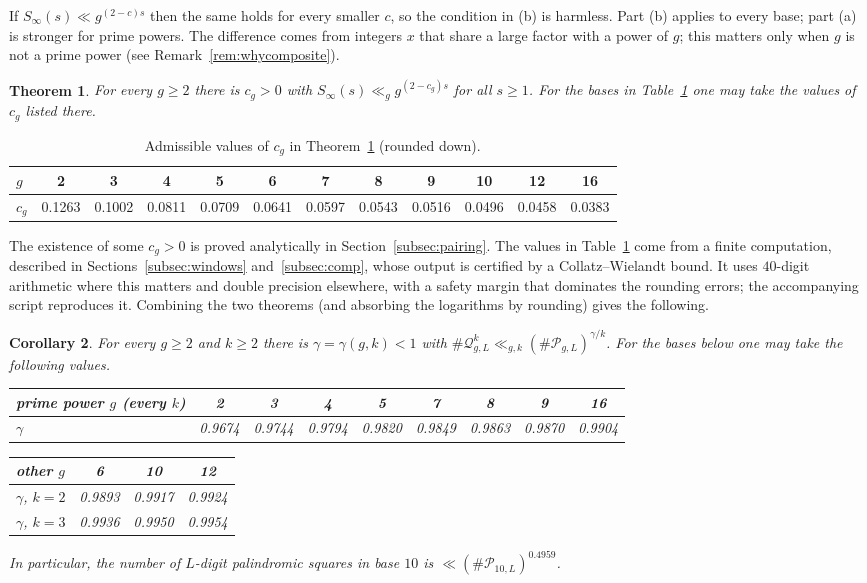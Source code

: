 \documentclass[11pt]{amsart}
\newtheorem{theorem}{Theorem}[section]
\newtheorem{corollary}[theorem]{Corollary}
\theoremstyle{definition}
\numberwithin{equation}{section}
\newcommand{\cP}{\mathcal{P}}
\newcommand{\cQ}{\mathcal{Q}}
\newcommand{\Sinf}{S_\infty}
\begin{document}
If $\Sinf(s)\ll g^{(2-c)s}$ then the same holds for every smaller $c$, so
the condition in (b) is harmless. Part (b) applies to every base; part (a)
is stronger for prime powers. The difference comes from integers $x$ that
share a large factor with a power of $g$; this matters only when $g$ is
not a prime power (see Remark~\ref{rem:whycomposite}).

\begin{theorem}\label{thm:sup}
For every $g\ge2$ there is $c_g>0$ with $\Sinf(s)\ll_gg^{(2-c_g)s}$ for all
$s\ge1$. For the bases in Table~\ref{tab:c} one may take the values of $c_g$
listed there.
\end{theorem}

\begin{table}[ht]
\caption{Admissible values of $c_g$ in Theorem~\ref{thm:sup} (rounded down).}\label{tab:c}
\small
\begin{tabular}{@{}lccccccccccc@{}}
\toprule
$g$ & 2 & 3 & 4 & 5 & 6 & 7 & 8 & 9 & 10 & 12 & 16\\
\midrule
$c_g$ & 0.1263 & 0.1002 & 0.0811 & 0.0709 & 0.0641 & 0.0597 & 0.0543 & 0.0516 & 0.0496 & 0.0458 & 0.0383\\
\bottomrule
\end{tabular}
\end{table}

The existence of some $c_g>0$ is proved analytically in
Section~\ref{subsec:pairing}. The values in Table~\ref{tab:c} come from a
finite computation, described in Sections~\ref{subsec:windows}
and~\ref{subsec:comp}, whose output is certified by a Collatz--Wielandt
bound. It uses $40$-digit arithmetic where this matters and double
precision elsewhere, with a safety margin that dominates the rounding
errors; the accompanying script reproduces it.
Combining the two theorems (and absorbing the logarithms by rounding) gives
the following.

\begin{corollary}\label{cor:main}
For every $g\ge2$ and $k\ge2$ there is $\gamma=\gamma(g,k)<1$ with
$\#\cQ^k_{g,L}\ll_{g,k}(\#\cP_{g,L})^{\gamma/k}$. For the bases below one
may take the following values.
\begin{center}\small\upshape
\begin{tabular}{@{}lcccccccc@{}}
\toprule
prime power $g$ (every $k$) & 2 & 3 & 4 & 5 & 7 & 8 & 9 & 16\\
\midrule
$\gamma$ & 0.9674 & 0.9744 & 0.9794 & 0.9820 & 0.9849 & 0.9863 & 0.9870 & 0.9904\\
\bottomrule
\end{tabular}

\medskip
\begin{tabular}{@{}lccc@{}}
\toprule
other $g$ & 6 & 10 & 12\\
\midrule
$\gamma$, $k=2$ & 0.9893 & 0.9917 & 0.9924\\
$\gamma$, $k=3$ & 0.9936 & 0.9950 & 0.9954\\
\bottomrule
\end{tabular}
\end{center}
In particular, the number of $L$-digit palindromic squares in base $10$
is $\ll(\#\cP_{10,L})^{0.4959}$.
\end{corollary}
\end{document}
